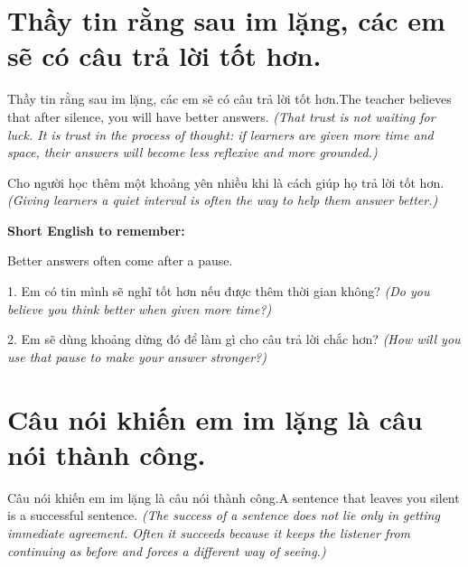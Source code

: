 \section{Thầy tin rằng sau im lặng, các em sẽ có câu trả lời tốt hơn.}
\begin{truyen}{Thầy tin rằng sau im lặng, các em sẽ có câu trả lời tốt hơn.}{The teacher believes that after silence, you will have better answers.}
\textit{(That trust is not waiting for luck. It is trust in the process of thought: if learners are given more time and space, their answers will become less reflexive and more grounded.)}
\end{truyen}

\begin{baihoc}
Cho người học thêm một khoảng yên nhiều khi là cách giúp họ trả lời tốt hơn.
\textit{(Giving learners a quiet interval is often the way to help them answer better.)}
\end{baihoc}

\begin{ghinhoanh}
\textbf{Short English to remember:}

Better answers often come after a pause.

\end{ghinhoanh}

\begin{tuhocnhanh}
1. Em có tin mình sẽ nghĩ tốt hơn nếu được thêm thời gian không? \textit{(Do you believe you think better when given more time?)}

2. Em sẽ dùng khoảng dừng đó để làm gì cho câu trả lời chắc hơn? \textit{(How will you use that pause to make your answer stronger?)}
\end{tuhocnhanh}
\ngancach


\section{Câu nói khiến em im lặng là câu nói thành công.}
\begin{truyen}{Câu nói khiến em im lặng là câu nói thành công.}{A sentence that leaves you silent is a successful sentence.}
\textit{(The success of a sentence does not lie only in getting immediate agreement. Often it succeeds because it keeps the listener from continuing as before and forces a different way of seeing.)}
\end{truyen}

